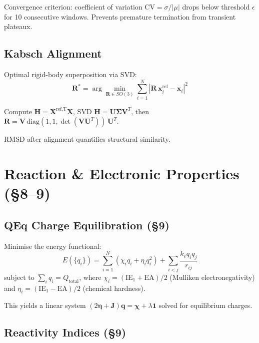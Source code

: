 \documentclass[11pt, a4paper]{article}
\begin{document}
Convergence criterion: coefficient of variation $\text{CV} = \sigma / |\mu|$ drops below threshold $\epsilon$ for 10 consecutive windows.  Prevents premature termination from transient plateaux.

\subsection{Kabsch Alignment}

Optimal rigid-body superposition via SVD:
\begin{equation}
\mathbf{R}^* = \arg\min_{\mathbf{R} \in SO(3)} \sum_{i=1}^{N} |\mathbf{R}\,\mathbf{x}_i^\text{ref} - \mathbf{x}_i|^2
\end{equation}

Compute $\mathbf{H} = \mathbf{X}^\text{ref,T} \mathbf{X}$, SVD $\mathbf{H} = \mathbf{U}\boldsymbol{\Sigma}\mathbf{V}^T$, then $\mathbf{R} = \mathbf{V}\,\text{diag}(1,1,\det(\mathbf{V}\mathbf{U}^T))\,\mathbf{U}^T$.

RMSD after alignment quantifies structural similarity.


\section{Reaction \& Electronic Properties (\S8--9)}

\subsection{QEq Charge Equilibration (\S9)}

Minimise the energy functional:
\begin{equation}
E(\{q_i\}) = \sum_{i=1}^{N}(\chi_i q_i + \eta_i q_i^2) + \sum_{i<j} \frac{k_e q_i q_j}{r_{ij}}
\end{equation}
subject to $\sum_i q_i = Q_\text{total}$, where $\chi_i = (\text{IE}_1 + \text{EA})/2$ (Mulliken electronegativity) and $\eta_i = (\text{IE}_1 - \text{EA})/2$ (chemical hardness).

This yields a linear system $(2\boldsymbol{\eta} + \mathbf{J})\mathbf{q} = \boldsymbol{\chi} + \lambda\mathbf{1}$ solved for equilibrium charges.

\subsection{Reactivity Indices (\S9)}
\end{document}
